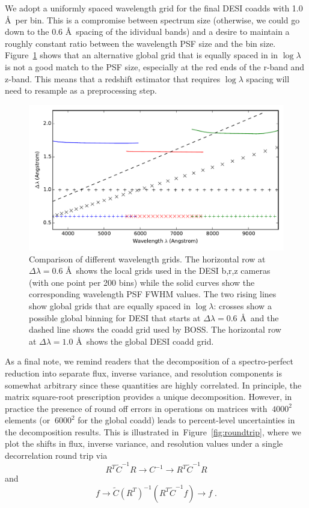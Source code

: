 \documentclass[12pt]{article}
\providecommand{\fig}[1]{Figure~\ref{fig:#1}}
\begin{document}
We adopt a uniformly spaced wavelength grid for the final DESI coadds with 1.0 \AA\ per bin. This is a compromise between spectrum size (otherwise, we could go down to the 0.6 \AA\ spacing of the idividual bands) and a desire to maintain a roughly constant ratio between the wavelength PSF size and the bin size. \fig{grids} shows that an alternative global grid that is equally spaced in in $\log\lambda$ is not a good match to the PSF size, especially at the red ends of the r-band and z-band. This means that a redshift estimator that requires $\log\lambda$ spacing will need to resample as a preprocessing step.

\begin{figure}[htb]
\begin{center}
\includegraphics[width=5in]{fig/grids}
\caption{Comparison of different wavelength grids. The horizontal row at $\Delta\lambda = 0.6$ \AA\ shows the local grids used in the DESI b,r,z cameras (with one point per 200 bins) while the solid curves show the corresponding wavelength PSF FWHM values. The two rising lines show global grids that are equally spaced in $\log\lambda$: crosses show a possible global binning for DESI that starts at $\Delta\lambda = 0.6$ \AA\ and the dashed line shows the coadd grid used by BOSS. The horizontal row at $\Delta\lambda = 1.0$ \AA\ shows the global DESI coadd grid.}
\label{fig:grids}
\end{center}
\end{figure}

As a final note, we remind readers that the decomposition of a spectro-perfect reduction into separate flux, inverse variance, and resolution components is somewhat arbitrary since these quantities are highly correlated. In principle, the matrix square-root prescription provides a unique decomposition. However, in practice the presence of round off errors in operations on matrices with $~4000^2$ elements (or $~6000^2$ for the global coadd) leads to percent-level uncertainties in the decomposition results.  This is illustrated in~\fig{roundtrip}, where we plot the shifts in flux, inverse variance, and resolution values under a single decorrelation round trip via
\begin{equation}
R^T \tilde{C}^{-1} R \rightarrow C^{-1} \rightarrow R^T \tilde{C}^{-1} R
\end{equation}
and
\begin{equation}
f \rightarrow \tilde{C} (R^T)^{-1} \left( R^T \tilde{C}^{-1} f \right) \rightarrow f \; .
\end{equation}
\end{document}
